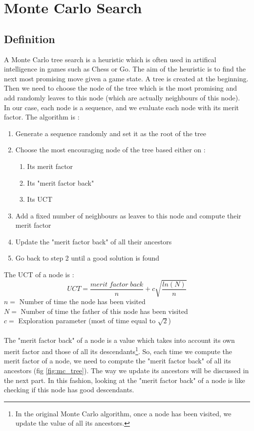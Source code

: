 \documentclass[a4paper,11pt,openany]{article}
\begin{document}
\section{Monte Carlo Search}
\subsection{Definition}
\noindent
A Monte Carlo tree search \cite{mc} is a heuristic which is often used in artifical intelligence in games such as Chess or Go. The aim of the heuristic is to find the next most promising move given a game state. A tree is created at the beginning. Then we need to choose the node of the tree which is the most promising and add randomly leaves to this node (which are actually neighbours of this node).\\
In our case, each node is a sequence, and we evaluate each node with its merit factor. The algorithm is :
\begin{enumerate}
\item Generate a sequence randomly and set it as the root of the tree
\item Choose the most encouraging node of the tree based either on :
\begin{enumerate}
\item Its merit factor
\item Its "merit factor back"
\item Its UCT
\end{enumerate}
\item Add a fixed number of neighbours as leaves to this node and compute their merit factor
\item Update the "merit factor back" of all their ancestors
\item Go back to step 2 until a good solution is found
\end{enumerate}
The UCT of a node is :
\begin{equation}
UCT=\frac{merit\;factor\;back}{n}+c\sqrt{\frac{ln(N)}{n}}
\end{equation}
$n=$ Number of time the node has been visited\\
$N=$ Number of time the father of this node has been visited\\
$c=$ Exploration parameter (most of time equal to $\sqrt{2}$)\\\\
The "merit factor back" of a node is a value which takes into account its own merit factor and those of all its descendants\footnote{In the original Monte Carlo algorithm, once a node has been visited, we update the value of all its ancestors.}. So, each time we compute the merit factor of a node, we need to compute the "merit factor back" of all its ancestors (fig \ref{fig:mc_tree}). The way we update its ancestors will be discussed in the next part. In this fashion, looking at the "merit factor back" of a node is like checking if this node has good descendants. 
\end{document}
